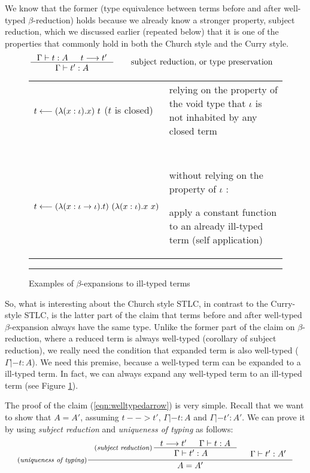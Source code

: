We know that the former (type equivalence between terms before and after
well-typed $\beta$-reduction) holds because we already know
a stronger property, subject reduction, which we discussed earlier
(repeated below) that it is one of the properties that commonly hold
in both the Church style and the Curry style.
\begin{align*}
\inference{\Gamma |- t : A  & t --> t'}{\Gamma |- t' : A}
 &\qquad \text{subject reduction, or type preservation}
\end{align*}

\begin{figure}
\begin{singlespace}
\begin{tabular}{lp{7cm}}
$t <-- (\lambda(x:\iota).x)~t$ \qquad ($t$ is closed)&
relying on the property of the void type
that $\iota$ is not inhabited by any closed term
\\ ~ \\
$t <-- (\lambda(x:\iota -> \iota).t)~(\lambda(x:\iota).x~x)$ &
without relying on the property of $\iota$ : \par
apply a constant function to an already ill-typed term (self application)
\end{tabular}
\end{singlespace}
\caption{Examples of $\beta$-expansions to ill-typed terms}
\label{ill-typed_expand}
\hrule
\end{figure}

So, what is interesting about the Church style STLC, in contrast to
the Curry-style STLC, is the latter part of the claim that terms before and
after well-typed $\beta$-expansion always have the same type. Unlike
the former part of the claim on $\beta$-reduction, where a reduced term
is always well-typed (corollary of subject reduction), we really need
the condition that expanded term is also well-typed ($\Gamma |- t : A$).
We need this premise, because a well-typed term can be expanded to a ill-typed term.
In fact, we can always expand any well-typed term to an ill-typed term
(see Figure \ref{ill-typed_expand}).

The proof of the claim (\ref{eqn:welltypedarrow}) is very simple.
Recall that we want to show that $A = A'$,
assuming $t --> t'$, $\Gamma |- t : A$ and $\Gamma |- t' : A'$.
We can prove it by using \emph{subject reduction} and
\emph{uniqueness of typing} as follows:
\[ \inference[(\emph{uniqueness of typing})]
	{ \inference[(\emph{subject reduction})\!\!\!]
		{t --> t' & \Gamma |- t : A}
		{\Gamma |- t' : A \phantom{a_f}} 
	& \Gamma |- t' : A' }
	{ A = A' }
\]

